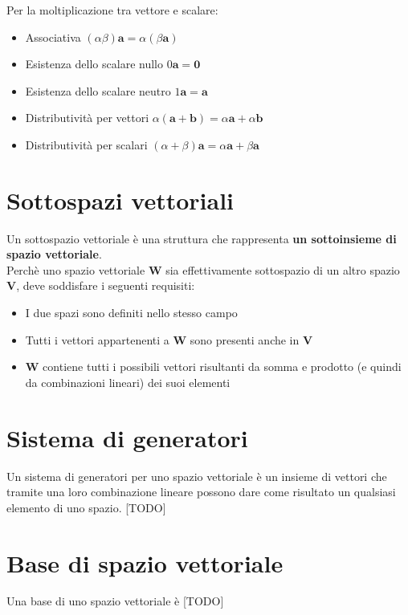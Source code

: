\documentclass{article}
\begin{document}
Per la moltiplicazione tra vettore e scalare:
\begin{itemize}
    \item Associativa \((\alpha \beta) \mathbf{a} = \alpha (\beta \mathbf{a})\)
    \item Esistenza dello scalare nullo \(0 \mathbf{a} = \mathbf{0}\)
    \item Esistenza dello scalare neutro \(1 \mathbf{a} = \mathbf{a}\)
    \item Distributività per vettori \(\alpha (\mathbf{a} + \mathbf{b}) = \alpha \mathbf{a} + \alpha \mathbf{b}\)
    \item Distributività per scalari \((\alpha + \beta) \mathbf{a} = \alpha \mathbf{a} + \beta \mathbf{a}\)
\end{itemize}

\section{Sottospazi vettoriali}
Un sottospazio vettoriale è una struttura che rappresenta \textbf{un sottoinsieme di spazio vettoriale}.\\
Perchè uno spazio vettoriale \(\mathbf{W}\) sia effettivamente sottospazio di un altro spazio \(\mathbf{V}\), deve soddisfare i seguenti requisiti:
\begin{itemize}
    \item I due spazi sono definiti nello stesso campo
    \item Tutti i vettori appartenenti a \(\mathbf{W}\) sono presenti anche in \(\mathbf{V}\)
    \item \(\mathbf{W}\) contiene tutti i possibili vettori risultanti da somma e prodotto (e quindi da combinazioni lineari) dei suoi elementi
\end{itemize}

\section{Sistema di generatori}
Un sistema di generatori per uno spazio vettoriale è un insieme di vettori che tramite una loro combinazione lineare possono dare come risultato un qualsiasi elemento di uno spazio.
[TODO]

\section{Base di spazio vettoriale}
Una base di uno spazio vettoriale è [TODO]
\end{document}
